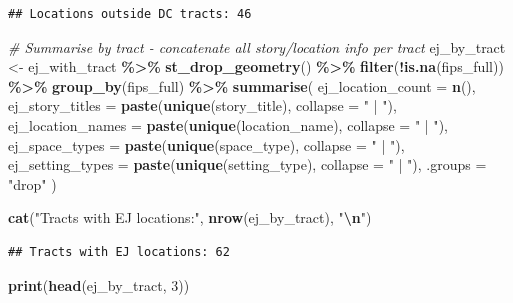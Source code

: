 \documentclass[
]{article}
\newenvironment{Shaded}{\begin{snugshade}}{\end{snugshade}}
\newcommand{\AttributeTok}[1]{\textcolor[rgb]{0.13,0.29,0.53}{#1}}
\newcommand{\CommentTok}[1]{\textcolor[rgb]{0.56,0.35,0.01}{\textit{#1}}}
\newcommand{\DecValTok}[1]{\textcolor[rgb]{0.00,0.00,0.81}{#1}}
\newcommand{\FunctionTok}[1]{\textcolor[rgb]{0.13,0.29,0.53}{\textbf{#1}}}
\newcommand{\NormalTok}[1]{#1}
\newcommand{\OtherTok}[1]{\textcolor[rgb]{0.56,0.35,0.01}{#1}}
\newcommand{\SpecialCharTok}[1]{\textcolor[rgb]{0.81,0.36,0.00}{\textbf{#1}}}
\newcommand{\StringTok}[1]{\textcolor[rgb]{0.31,0.60,0.02}{#1}}
\begin{document}
\begin{verbatim}
## Locations outside DC tracts: 46
\end{verbatim}

\begin{Shaded}
\begin{Highlighting}[]
\CommentTok{\# Summarise by tract {-} concatenate all story/location info per tract}
\NormalTok{ej\_by\_tract }\OtherTok{\textless{}{-}}\NormalTok{ ej\_with\_tract }\SpecialCharTok{\%\textgreater{}\%}
  \FunctionTok{st\_drop\_geometry}\NormalTok{() }\SpecialCharTok{\%\textgreater{}\%}
  \FunctionTok{filter}\NormalTok{(}\SpecialCharTok{!}\FunctionTok{is.na}\NormalTok{(fips\_full)) }\SpecialCharTok{\%\textgreater{}\%}
  \FunctionTok{group\_by}\NormalTok{(fips\_full) }\SpecialCharTok{\%\textgreater{}\%}
  \FunctionTok{summarise}\NormalTok{(}
    \AttributeTok{ej\_location\_count =} \FunctionTok{n}\NormalTok{(),}
    \AttributeTok{ej\_story\_titles =} \FunctionTok{paste}\NormalTok{(}\FunctionTok{unique}\NormalTok{(story\_title), }\AttributeTok{collapse =} \StringTok{" | "}\NormalTok{),}
    \AttributeTok{ej\_location\_names =} \FunctionTok{paste}\NormalTok{(}\FunctionTok{unique}\NormalTok{(location\_name), }\AttributeTok{collapse =} \StringTok{" | "}\NormalTok{),}
    \AttributeTok{ej\_space\_types =} \FunctionTok{paste}\NormalTok{(}\FunctionTok{unique}\NormalTok{(space\_type), }\AttributeTok{collapse =} \StringTok{" | "}\NormalTok{),}
    \AttributeTok{ej\_setting\_types =} \FunctionTok{paste}\NormalTok{(}\FunctionTok{unique}\NormalTok{(setting\_type), }\AttributeTok{collapse =} \StringTok{" | "}\NormalTok{),}
    \AttributeTok{.groups =} \StringTok{"drop"}
\NormalTok{  )}

\FunctionTok{cat}\NormalTok{(}\StringTok{"Tracts with EJ locations:"}\NormalTok{, }\FunctionTok{nrow}\NormalTok{(ej\_by\_tract), }\StringTok{"}\SpecialCharTok{\textbackslash{}n}\StringTok{"}\NormalTok{)}
\end{Highlighting}
\end{Shaded}

\begin{verbatim}
## Tracts with EJ locations: 62
\end{verbatim}

\begin{Shaded}
\begin{Highlighting}[]
\FunctionTok{print}\NormalTok{(}\FunctionTok{head}\NormalTok{(ej\_by\_tract, }\DecValTok{3}\NormalTok{))}
\end{Highlighting}
\end{Shaded}
\end{document}
